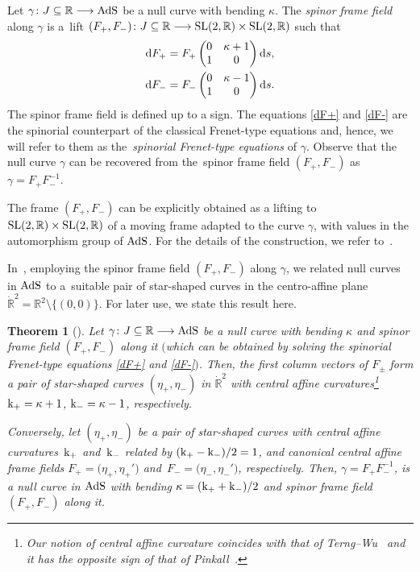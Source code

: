 \documentclass[pdftex]{sigma}
\numberwithin{equation}{section}
\newtheorem{Theorem}{Theorem}[section]
\def\bending{\kappa}
\def\R{\mathbb{R}}
\def\curvature{{\rm k}}
\def\SL{{\rm SL}(2,\R)}
\def\AdS{{\rm AdS}}
\begin{document}
Let $\gamma\colon J\subseteq\R\longrightarrow\AdS$ be a null curve with bending $\bending$. The \emph{spinor frame field} along $\gamma$ is a~lift $(F_+,F_-)\colon J\subseteq\R\longrightarrow\SL\times\SL$ such that
\begin{gather}
	{\rm d}F_+ = F_+ \begin{pmatrix} 0 & \bending+1 \\ 1 & 0 \end{pmatrix}{\rm d} s,\label{dF+}\\
	{\rm d}F_- = F_- \begin{pmatrix} 0 & \bending-1 \\ 1 & 0 \end{pmatrix}{\rm d} s.\label{dF-}
\end{gather}
The spinor frame field is defined up to a sign. The equations \eqref{dF+} and \eqref{dF-} are the spinorial counterpart of the classical Frenet-type equations and, hence, we will refer to them as the~\emph{spinorial Frenet-type equations} of $\gamma$. Observe that the null curve $\gamma$ can be recovered from the~spinor frame field $(F_+,F_-)$ as
$\gamma=F_+F_-^{-1}$.

\begin{Remark} The frame $(F_+,F_-)$ can be explicitly obtained as a lifting to $\SL\times\SL$ of a moving frame adapted to the curve $\gamma$, with values in the automorphism group of $\AdS$. For the details of the construction, we refer to~\cite{MP}.
\end{Remark}

In~\cite{MP}, employing the spinor frame field $(F_+,F_-)$ along $\gamma$, we related null curves in $\AdS$ to a~suitable pair of star-shaped curves in the centro-affine plane $\dot{\R}^2=\R^2\setminus\{(0,0)\}$. For later use, we state this result here.

\begin{Theorem}[{\cite[Theorem 3.3]{MP}}]\label{relation} Let $\gamma\colon J\subseteq\R\longrightarrow\AdS$ be a null curve with bending $\bending$ and spinor frame field $(F_+,F_-)$ along it $($which can be obtained by solving the spinorial Frenet-type equations \eqref{dF+} and \eqref{dF-}$)$. Then, the first column vectors of $F_\pm$ form a pair of star-shaped curves ${(\eta_+,\eta_-)}$ in $\dot{\R}^2$ with central affine curvatures\footnote{Our notion of central affine curvature coincides with that of Terng--Wu~\cite{TW1} and it has the opposite sign of that of Pinkall~\cite{P}.}
$\curvature_+=\bending+1$, $\curvature_-=\bending-1$, respectively.
	
	Conversely, let $(\eta_+,\eta_-)$ be a pair of star-shaped curves with central affine curvatures~$\curvature_+$ and~$\curvature_-$ related by $(\curvature_+-\curvature_-)/2=1$, and canonical central affine frame fields $F_+=\bigl(\eta_+,\eta_+'\bigr)$ and~${F_-=\bigl(\eta_-,\eta_-'\bigr)}$, respectively. Then, $\gamma=F_+F_-^{-1}$,
	is a null curve in $\AdS$ with bending $\bending=(\curvature_++\curvature_-)/2$ and spinor frame field $(F_+,F_-)$ along it.
\end{Theorem}
\end{document}
